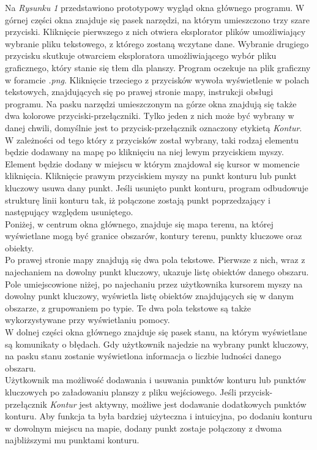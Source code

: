\documentclass[a4paper,12pt]{article}
\newcommand\tab[1][0.6cm]{\hspace*{#1} }
\begin{document}
\tab Na \textit{Rysunku 1} przedstawiono prototypowy wygląd okna głównego programu. W górnej części okna znajduje się pasek narzędzi, na którym umieszczono trzy szare przyciski. Kliknięcie pierwszego z nich otwiera eksplorator plików umożliwiający wybranie pliku tekstowego, z którego zostaną wczytane dane. Wybranie drugiego przycisku skutkuje otwarciem eksploratora umożliwiającego wybór pliku graficznego, który stanie się tłem dla planszy. Program oczekuje na plik graficzny w foramcie \textit{.png}. Kliknięcie trzeciego z przycisków wywoła wyświetlenie w polach tekstowych, znajdujących się po prawej stronie mapy, instrukcji obsługi programu. Na pasku narzędzi umieszczonym na górze okna znajdują się także dwa kolorowe przyciski-przełączniki. Tylko jeden z nich może być wybrany w danej chwili, domyślnie jest to przycisk-przełącznik oznaczony etykietą \textit{Kontur}.
W zależności od tego który z przycisków został wybrany, taki rodzaj elementu będzie dodawany na mapę po kliknięciu na niej lewym przyciskiem myszy. Element będzie dodany w miejscu w którym znajdował się kursor w momencie kliknięcia. Kliknięcie prawym przyciskiem myszy na punkt konturu lub punkt kluczowy usuwa dany punkt. Jeśli usunięto punkt konturu, program odbudowuje strukturę linii konturu tak, iż połączone zostają punkt poprzedzający i następujący względem usuniętego.
\\\tab Poniżej, w centrum okna głównego, znajduje się mapa terenu, na której wyświetlane mogą być granice obszarów, kontury terenu, punkty kluczowe oraz obiekty.
\\\tab Po prawej stronie mapy znajdują się dwa pola tekstowe. Pierwsze z nich, wraz z najechaniem na dowolny punkt kluczowy, ukazuje listę obiektów danego obszaru. Pole umiejscowione niżej, po najechaniu przez użytkownika kursorem myszy na dowolny punkt kluczowy, wyświetla listę obiektów znajdujących się w danym obszarze, z grupowaniem po typie. Te dwa pola tekstowe są także wykorzystywane przy wyświetlaniu pomocy.
\\\tab W dolnej części okna głównego znajduje się pasek stanu, na którym wyświetlane są komunikaty o błędach. Gdy użytkownik najedzie na wybrany punkt kluczowy, na pasku stanu zostanie wyświetlona informacja o liczbie ludności danego obszaru.
\\\tab Użytkownik ma możliwość dodawania i usuwania punktów konturu lub punktów kluczowych po załadowaniu planszy z pliku wejściowego. Jeśli przycisk-przełącznik \textit{Kontur} jest aktywny, możliwe jest dodawanie dodatkowych punktów konturu. Aby funkcja ta była bardziej użyteczna i intuicyjna, po dodaniu konturu w dowolnym miejscu na mapie, dodany punkt zostaje połączony z dwoma najbliższymi mu punktami konturu.
\end{document}
